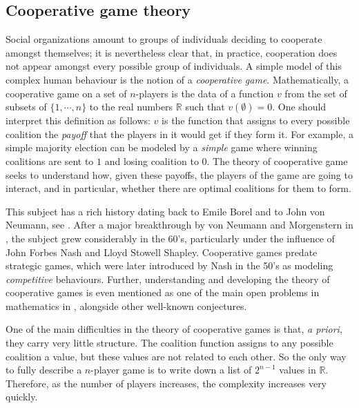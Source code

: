 \documentclass[a4paper,12pt]{amsart}
\begin{document}
\subsection*{Cooperative game theory} Social organizations amount to groups of individuals deciding to cooperate amongst themselves; it is nevertheless clear that, in practice, cooperation does not appear amongst every possible group of individuals. A simple model of this complex human behaviour is the notion of a \textit{cooperative game}. Mathematically, a cooperative game on a set of $n$-players is the data of a function $v$ from the set of subsets of $\{1,\cdots,n\}$ to the real numbers $\mathbb{R}$ such that $v(\emptyset) = 0$. One should interpret this definition as follows: $v$ is the function that assigns to every possible coalition the \textit{payoff} that the players in it would get if they form it. For example, a simple majority election can be modeled by a \textit{simple} game where winning coalitions are sent to $1$ and losing coalition to $0$. The theory of cooperative game seeks to understand how, given these payoffs, the players of the game are going to interact, and in particular, whether there are optimal coalitions for them to form. 

\medskip

This subject has a rich history dating back to Emile Borel and to John von Neumann, see \cite{Borel1924-BORAPD, vonNewmann1, leonard2010neumann}. After a major breakthrough by von Neumann and Morgenstern in \cite{vonNeumann2}, the subject grew considerably in the 60's, particularly under the influence of John Forbes Nash and Lloyd Stowell Shapley. Cooperative games predate strategic games, which were later introduced by Nash in the 50's as modeling \textit{competitive} behaviours. Further, understanding and developing the theory of cooperative games is even mentioned as one of the main open problems in mathematics in \cite{Openproblems}, alongside other well-known conjectures.

\medskip

One of the main difficulties in the theory of cooperative games is that, \textit{a priori}, they carry very little structure. The coalition function assigns to any possible coalition a value, but these values are not related to each other. So the only way to fully describe a $n$-player game is to write down a list of $2^{n-1}$ values in $\mathbb{R}$. Therefore, as the number of players increases, the complexity increases very quickly. 

\medskip
\end{document}
